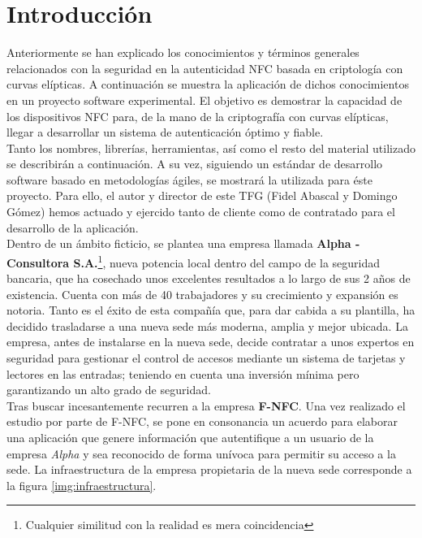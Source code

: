 \documentclass[../PFC.tex]{subfiles}
\begin{document}
\section{Introducción}
\label{App:Introducción}

Anteriormente se han explicado los conocimientos y términos generales relacionados con la seguridad en la autenticidad NFC basada en criptología con curvas elípticas. A continuación se muestra la aplicación de dichos conocimientos en un proyecto software experimental. El objetivo es demostrar la capacidad de los dispositivos NFC para, de la mano de la criptografía con curvas elípticas, llegar a desarrollar un sistema de autenticación óptimo y fiable.\\

Tanto los nombres, librerías, herramientas, así como el resto del material utilizado se describirán a continuación. A su vez, siguiendo un estándar de desarrollo software basado en metodologías ágiles, se mostrará la utilizada para éste proyecto. Para ello,  el autor y director de este TFG (Fidel Abascal y Domingo Gómez) hemos actuado y ejercido tanto de cliente como de contratado para el desarrollo de la aplicación. \\

Dentro de un ámbito ficticio, se plantea una empresa llamada \textbf{Alpha - Consultora S.A.}\footnote{Cualquier similitud con la realidad es mera coincidencia}, nueva potencia local dentro del campo de la seguridad bancaria, que ha cosechado unos excelentes resultados a lo largo de sus 2 años de existencia. Cuenta con más de 40 trabajadores y su crecimiento y expansión es notoria. Tanto es el éxito de esta compañía que, para dar cabida a su plantilla, ha decidido trasladarse a una nueva sede más moderna, amplia y mejor ubicada. La empresa, antes de instalarse en la nueva sede, decide contratar a unos expertos en seguridad para gestionar el control de accesos mediante un sistema de tarjetas y lectores en las entradas; teniendo en cuenta una inversión mínima pero garantizando un alto grado de seguridad. \\

Tras buscar incesantemente recurren a la empresa \textbf{F-NFC}. Una vez realizado el estudio por parte de F-NFC, se pone en consonancia un acuerdo para elaborar una aplicación que genere información que autentifique a un usuario de la empresa \textit{Alpha} y sea reconocido de forma unívoca para permitir su acceso a la sede. La infraestructura de la empresa propietaria de la nueva sede corresponde a la figura \ref{img:infraestructura}.
\end{document}
